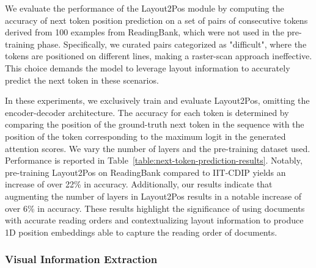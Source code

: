We evaluate the performance of the Layout2Pos module by computing the accuracy of next token position prediction on a set of pairs of consecutive tokens derived from 100 examples from ReadingBank, which were not used in the pre-training phase. Specifically, we curated pairs categorized as "difficult", where the tokens are positioned on different lines, making a raster-scan approach ineffective. This choice demands the model to leverage layout information to accurately predict the next token in these scenarios.

In these experiments, we exclusively train and evaluate Layout2Pos, omitting the encoder-decoder architecture. The accuracy for each token is determined by comparing the position of the ground-truth next token in the sequence with the position of the token corresponding to the maximum logit in the generated attention scores. We vary the number of layers and the pre-training dataset used. Performance is reported in Table~\ref{table:next-token-prediction-results}. Notably, pre-training Layout2Pos on ReadingBank compared to IIT-CDIP yields an increase of over 22\% in accuracy. Additionally, our results indicate that augmenting the number of layers in Layout2Pos results in a notable increase of over 6\% in accuracy. These results highlight the significance of using documents with accurate reading orders and contextualizing layout information to produce 1D position embeddings able to capture the reading order of documents.

\subsubsection{Visual Information Extraction}

